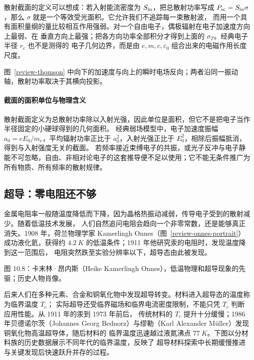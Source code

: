 散射截面的定义可以想成：若入射能流密度为 $S_{\rm in}$，把总散射功率写成
$P_{\rm sc}=S_{\rm in}\sigma$，那么 $\sigma$ 就是一个等效受光面积。它允许我们不追踪每一束散射波，
而用一个具有面积量纲的量比较相互作用强弱。对一个自由电子，偶极辐射在电子加速度方向上最弱、在
垂直方向上最强；把各方向功率全部积分才得到上面的 $\sigma_T$。经典电子半径 $r_e$ 也不是测得的
电子几何边界，而是由 $e,m,c,\varepsilon_0$ 组合出来的电磁作用长度尺度。

图~\ref{review-thomson} 中向下的加速度与向上的瞬时电场反向；两者沿同一振动轴，散射功率取决于其横向投影。

\thomsonScatteringDiagram


\paragraph{截面的面积单位与物理含义}
散射截面定义为总散射功率除以入射光强，因此单位是面积，但它不是把电子当作半径固定的小硬球得到的几何面积。
经典弱场模型中，电子加速度振幅 $a_0=eE_0/m_e$，平均辐射功率正比于 $a_0^2$，入射光强正比于 $E_0^2$，相除后振幅抵消，得到与入射强度无关的截面。
若频率接近束缚电子的共振，或光子反冲与电子静能不可忽略，自由、非相对论电子的这套推导便不足以使用；它不能无条件推广为所有物质、所有频率的散射规律。

\subsection{超导：零电阻还不够}

金属电阻率一般随温度降低而下降，因为晶格热振动减弱，传导电子受到的散射减少。随着低温技术发展，
人们自然追问电阻会趋向一个非零常数，还是能够真正消失。1908 年，荷兰物理学家 Kamerlingh Onnes（图~\ref{review-onnes-portrait}）
成功液化氦，获得约 $\SI{4.2}{K}$ 的低温条件；1911 年他研究汞的电阻时，发现温度降到这一范围后，
电阻突然跌至实验分辨率以下，超导态由此被发现。

%
{图 10.8：卡末林·昂内斯（Heike Kamerlingh Onnes），低温物理和超导现象的先驱；历史人物肖像。\label{review-onnes-portrait}}

后来人们在多种元素、合金和铜氧化物中发现超导转变。材料进入超导态的温度称为临界温度 $T_c$；
实际超导还受临界磁场和临界电流密度限制，不能只凭 $T_c$ 判断应用性能。从 1911 年的汞到 1973 年前后，
传统材料的 $T_c$ 提升十分缓慢；1986 年贝德诺尔茨（Johannes Georg Bednorz）与缪勒（Karl Alexander M\"uller）发现铜氧化物高温超导体，随后材料的
临界温度迅速越过液氮沸点 $\SI{77}{K}$。下图以分材料族的历史数据展示不同年代的临界温度，反映了
超导材料探索中长期缓慢推进与关键发现后快速跃升并存的过程。

